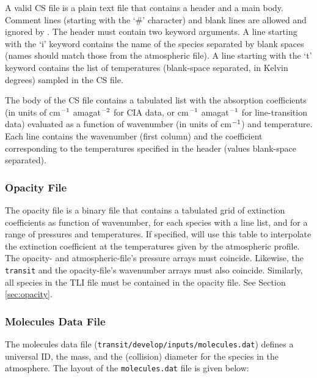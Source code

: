 \documentclass[letterpaper, 12pt]{article}
\begin{document}
A valid CS file is a plain text file that contains a
header and a main body.  Comment lines (starting with the `{\tttm \#}'
character) and blank lines are allowed and ignored by {\transit}.  The
header must contain two keyword arguments.  A line starting with the
`{\tttm i}' keyword contains the name of the species separated by
blank spaces (names should match those from the atmospheric file).  A
line starting with the `{\tttm t}' keyword contains the list of
temperatures (blank-space separated, in Kelvin degrees) sampled in the
CS file.

The body of the CS file contains a tabulated list with the absorption
coefficients (in units of cm$\sp{-1}$ amagat$\sp{-2}$ for CIA data,
or cm$\sp{-1}$ amagat$\sp{-1}$ for line-transition data) evaluated as a
function of wavenumber (in units of cm$\sp{-1}$) and temperature.
Each line contains the wavenumber (first column) and the coefficient
corresponding to the temperatures specified in the header (values
blank-space separated).

\subsubsection{Opacity File}
\label{sec:opac-file}

The opacity file is a binary file that contains a tabulated grid of
extinction coefficients as function of wavenumber, for each species
with a line list, and for a range of pressures and temperatures.  If
specified, {\transit} will use this table to interpolate the
extinction coefficient at the temperatures given by the atmospheric
profile.  The opacity- and atmospheric-file's pressure arrays must
coincide.  Likewise, the {\tt transit} and the opacity-file's
wavenumber arrays must also coincide.  Similarly, all species in the
TLI file must be contained in the opacity file.  See Section
\ref{sec:opacity}.


\subsubsection{Molecules Data File}

The molecules data file ({\tt transit/develop/inputs/molecules.dat})
defines a universal ID, the mass, and the (collision) diameter for the
species in the atmosphere.
The layout of the {\tt molecules.dat} file is given below: \newline
\end{document}
